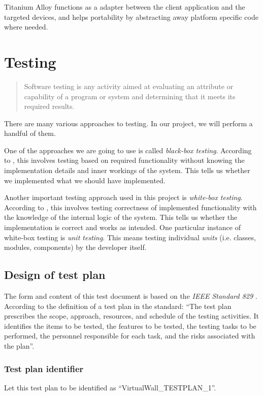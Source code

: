 \documentclass[11pt]{book}
\begin{document}
Titanium Alloy functions as a adapter between the client application and the targeted devices, and helps portability by abstracting away platform specific code where needed.

\chapter{Testing}

\begin{quotation}\noindent
Software testing is any activity aimed at evaluating an attribute or capability of a program or system and determining that it meets its required results. \cite{pan}
\end{quotation}

There are many various approaches to testing. In our project, we will perform a handful of them.

One of the approaches we are going to use is called \emph{black-box testing}. According to \cite{shinde}, this involves testing based on required functionality without knowing the implementation details and inner workings of the system. This tells us whether we implemented what we should have implemented.

Another important testing approach used in this project is \emph{white-box testing}. According to \cite{shinde}, this involves testing correctness of implemented functionality with the knowledge of the internal logic of the system. This tells us whether the implementation is correct and works as intended. One particular instance of white-box testing is \emph{unit testing}. This means testing individual \emph{units} (i.e. classes, modules, components) by the developer itself.

\section{Design of test plan}

The form and content of this test document is based on the \emph{IEEE Standard 829} \cite{ieee829}. According to the definition of a test plan in the standard: ``The test plan prescribes the scope, approach, resources, and schedule of the testing activities. It identifies the items to be tested, the features to be tested, the testing tasks to be performed, the personnel responsible for each task, and the risks associated with the plan''.

\subsection{Test plan identifier}
Let this test plan to be identified as ``VirtualWall\_TESTPLAN\_1''.
\end{document}
